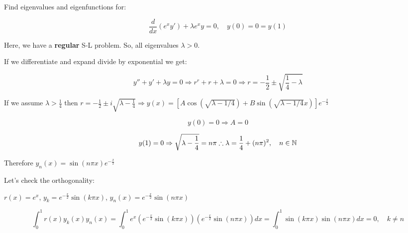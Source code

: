 \documentclass{article}
\begin{document}
Find eigenvalues and eigenfunctions for:

$$\frac{d}{dx} \left( e^x y' \right) + \lambda e^x y = 0, \quad y(0) = 0 = y(1)$$

Here, we have a \textbf{regular} S-L problem. So, all eigenvalues $\lambda > 0$. 

If we differentiate and expand divide by exponential we get:

$$y'' + y' + \lambda y = 0 \Rightarrow r^r + r + \lambda = 0 \Rightarrow r = - \frac{1}{2} \pm \sqrt{ \frac{1}{4} - \lambda}$$


If we assume $\lambda > \frac{1}{4}$ then $r = - \frac{1}{2} \pm i \sqrt{\lambda - \frac{1}{4}} \Rightarrow y(x) = \left[ A \cos( \sqrt{\lambda - 1/4}) + B \sin(\sqrt{\lambda - 1/4} x) \right] e^{- \frac{x}{2}}$

$$y(0) = 0 \Rightarrow A = 0$$

$$y(1) = 0 \Rightarrow \sqrt{\lambda - \frac{1}{4}} = n \pi \therefore \lambda = \frac{1}{4} + (n \pi)^2, \quad n \in \mathbb{N}$$

Therefore $y_n(x) = \sin (n \pi x) e^{- \frac{x}{2}}$

Let's check the orthogonality:

$r(x) = e^x$, $y_k = e^{- \frac{x}{2}} \sin (k \pi x)$, $y_n (x) =  e^{- \frac{x}{2}} \sin (n \pi x)$

$$\int_0^1 r(x) y_k(x) y_n(x) = \int_0^1 e^x \left( e^{- \frac{x}{2}} \sin(k \pi x) \right) \left( e^{- \frac{x}{2}} \sin(n \pi x) \right) dx = \int_0^1 \sin(k \pi x) \sin(n \pi x) dx = 0, \quad k \neq n$$
\end{document}

